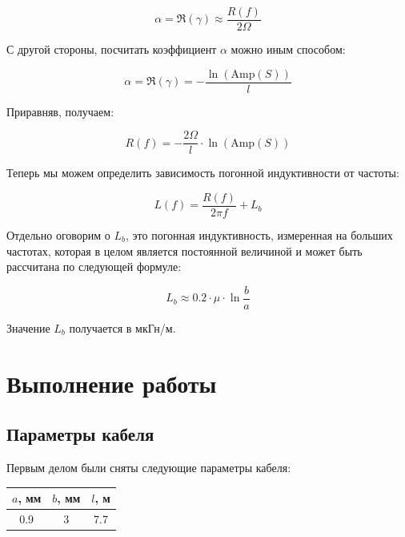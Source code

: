 \documentclass[a4paper, 12pt]{article}
\begin{document}
\begin{equation*}
	\alpha = \Re(\gamma) \approx \frac{R(f)}{2\Omega}
	\label{eq:alpha_1}
\end{equation*}

С другой стороны, посчитать коэффициент $\alpha$ можно иным способом:

\begin{equation*}
	\alpha = \Re(\gamma) = -\frac{\ln(\text{Amp}(S))}{l}
\end{equation*}

Приравняв, получаем:

\begin{equation}
	R(f) = -\frac{2\Omega}{l} \cdot \ln(\text{Amp}(S))
	\label{eq:R_pog}
\end{equation}

Теперь мы можем определить зависимость погонной индуктивности от частоты:

\begin{equation}
	L(f) = \frac{R(f)}{2\pi f} + L_b
	\label{eq:L_f}
\end{equation}

Отдельно оговорим о $L_b$, это погонная индуктивность, измеренная на больших частотах, которая в целом является постоянной величиной и может быть рассчитана по следующей формуле:

\begin{equation}
	L_b \approx 0.2 \cdot  \mu \cdot \ln \frac{b}{a}
	\label{eq:L_b}
\end{equation}

Значение $L_b$ получается в мкГн/м.

\section{Выполнение работы}

\subsection{Параметры кабеля}

Первым делом были сняты следующие параметры кабеля:


\begin{center}


\begin{tabular}{|c|c|c|}
	\hline 
	$a$, мм& $b$, мм  & $l$, м  \\ 
	\hline 
	0.9 & 3 & 7.7 \\ 
	\hline 
\end{tabular} 

	
\end{center}
\end{document}

